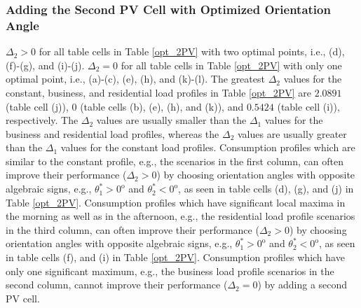 \subsubsection{Adding the Second PV Cell with Optimized Orientation Angle} 
$\Delta_2>0$ for all table cells in Table \ref{opt_2PV} with two optimal points, i.e., (d), (f)-(g), and (i)-(j). $\Delta_2=0$ for all table cells in Table \ref{opt_2PV} with only one optimal point, i.e., (a)-(c), (e), (h), and (k)-(l). The greatest $\Delta_2$ values for the constant, business, and residential load profiles in Table \ref{opt_2PV} are $2.0891$ (table cell (j)), $0$ (table cells (b), (e), (h), and (k)), and $0.5424$ (table cell (i)), respectively. The $\Delta_2$ values are usually smaller than the $\Delta_1$ values for the business and residential load profiles, whereas the $\Delta_2$ values are usually greater than the $\Delta_1$ values for the constant load profiles. Consumption profiles which are similar to the constant profile, e.g., the scenarios in the first column, can often improve their performance (\mbox{$\Delta_2>0$}) by choosing orientation angles with opposite algebraic signs, e.g., $\theta_1^*>0^\mathrm{o}$ and \mbox{$\theta_2^*<0^\mathrm{o}$}, as seen in table cells (d), (g), and (j) in Table \ref{opt_2PV}. Consumption profiles which have significant local maxima in the morning as well as in the afternoon, e.g., the residential load profile scenarios in the third column, can often improve their performance ($\Delta_2>0$) by choosing orientation angles with opposite algebraic signs, e.g., $\theta_1^*>0^\mathrm{o}$ and \mbox{$\theta_2^*<0^\mathrm{o}$}, as seen in table cells (f), and (i) in Table \ref{opt_2PV}. Consumption profiles which have only one significant maximum, e.g., the business load profile scenarios in the second column, cannot improve their performance ($\Delta_2=0$) by adding a second PV cell.

